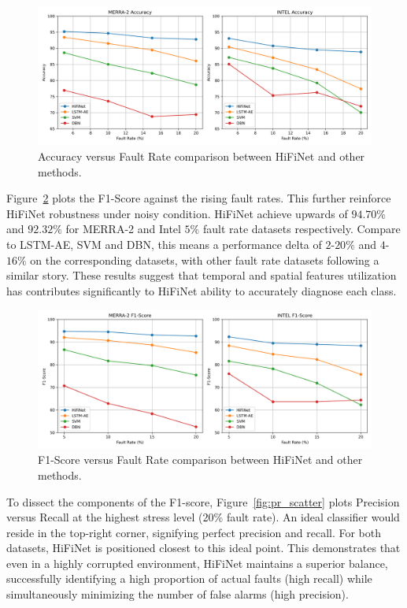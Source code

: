 \begin{figure}
  \centering
  \includegraphics[width=\linewidth]{images/accuracy.png}
  \caption{Accuracy versus Fault Rate comparison between HiFiNet and other methods.}
  \label{fig:accuracy}
\end{figure}

Figure~\ref{fig:f1} plots the F1-Score against the rising fault rates. This further reinforce HiFiNet robustness under noisy condition. HiFiNet achieve upwards of \(94.70\%\) and \(92.32\%\) for MERRA-2 and Intel \(5\%\) fault rate datasets respectively. Compare to LSTM-AE, SVM and DBN, this means a performance delta of \(2\)-\(20\%\) and \(4\)-\(16\%\) on the corresponding datasets, with other fault rate datasets following a similar story. These results suggest that temporal and spatial features utilization has contributes significantly to HiFiNet ability to accurately diagnose each class.

\begin{figure}
  \centering
  \includegraphics[width=\linewidth]{images/f1.png}
  \caption{F1-Score versus Fault Rate comparison between HiFiNet and other methods.}
  \label{fig:f1}
\end{figure}

To dissect the components of the F1-score, Figure~\ref{fig:pr_scatter} plots Precision versus Recall at the highest stress level (20\% fault rate). An ideal classifier would reside in the top-right corner, signifying perfect precision and recall. For both datasets, HiFiNet is positioned closest to this ideal point. This demonstrates that even in a highly corrupted environment, HiFiNet maintains a superior balance, successfully identifying a high proportion of actual faults (high recall) while simultaneously minimizing the number of false alarms (high precision).


